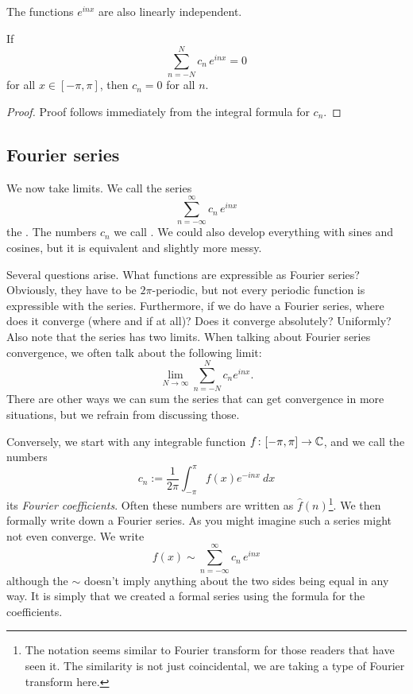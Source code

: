 The functions $e^{inx}$ are also linearly independent.

\begin{prop}
If
\begin{equation*}
\sum_{n=-N}^N c_n \, e^{inx} = 0
\end{equation*}
for all $x \in [-\pi,\pi]$, then $c_n = 0$ for all $n$.
\end{prop}

\begin{proof}
Proof follows immediately from the integral formula for $c_n$.
\end{proof}

\subsection{Fourier series}

We now take limits.  We call the series
\begin{equation*}
\sum_{n=-\infty}^\infty c_n \, e^{inx}
\end{equation*}
the \emph{}.  The numbers $c_n$
we call \emph{}.  We could also develop everything with
sines and cosines, but it is equivalent and slightly more messy.

Several questions arise.  What functions are expressible as 
Fourier series?  Obviously, they have to be $2\pi$-periodic, but not every
periodic function is expressible with the series.  Furthermore, if we do have
a Fourier series, where does it converge (where and if at all)?  Does it converge
absolutely?  Uniformly?  Also note that the series has two
limits.  When talking about Fourier series convergence, we often
talk about the following limit:
\begin{equation*}
\lim_{N\to\infty} 
\sum_{n=-N}^N c_n e^{inx} .
\end{equation*}
There are other ways we can sum the series that can get convergence in more
situations, but we refrain from discussing those.

\medskip

Conversely, we start with any integrable function $f \colon [-\pi,\pi] \to
{\mathbb{C}}$, and we call the numbers
\begin{equation*}
c_n := 
\frac{1}{2\pi} \int_{-\pi}^\pi
f(x) e^{-inx} ~ dx
\end{equation*}
its \emph{Fourier coefficients}.  Often these numbers are
written as $\hat{f}(n)$\footnote{The notation seems similar
to Fourier transform for those readers that have seen it.
The similarity is not just
coincidental, we are taking a type of Fourier transform here.}.
We then formally write down a Fourier series.
As you might imagine such a series might not even converge.
We write
\begin{equation*}
f(x) \sim
\sum_{n=-\infty}^\infty c_n \, e^{inx}
\end{equation*}
although the $\sim$ doesn't imply anything about the two sides being equal
in any way.  It is simply that we created a formal series using the formula
for the coefficients.

